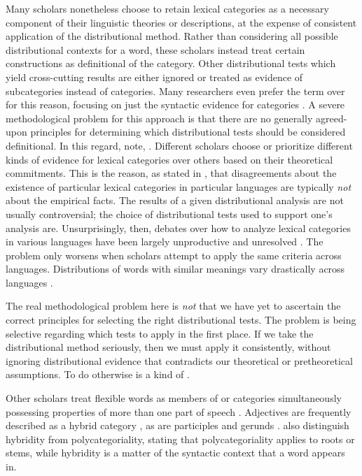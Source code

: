 Many scholars nonetheless choose to retain lexical categories as a necessary component of their linguistic theories or descriptions, at the expense of consistent application of the distributional method. Rather than considering all possible distributional contexts for a word, these scholars instead treat certain constructions as definitional of the category. Other distributional tests which yield cross-cutting results are either ignored or treated as evidence of subcategories instead of categories. Many researchers even prefer the term  over  for this reason, focusing on just the syntactic evidence for categories \parencites{Baker2003}{Rauh2010}. A severe methodological problem for this approach is that there are no generally agreed-upon principles for determining which distributional tests should be considered definitional. In this regard, \textcite[4]{SchachterShopen2007} note,  . Different scholars choose or prioritize different kinds of evidence for lexical categories over others based on their theoretical commitments. This is the reason, as stated in , that disagreements about the existence of particular lexical categories in particular languages are typically \emph{not} about the empirical facts. The results of a given distributional analysis are not usually controversial; the choice of distributional tests used to support one's analysis are. Unsurprisingly, then, debates over how to analyze lexical categories in various languages have been largely unproductive and unresolved \parencite[435]{Croft2005}. The problem only worsens when scholars attempt to apply the same criteria across languages. Distributions of words with similar meanings vary drastically across languages \parencite[§1.4.1]{Croft2001b}.

The real methodological problem here is \emph{not} that we have yet to ascertain the correct principles for selecting the right distributional tests. The problem is being selective regarding which tests to apply in the first place. If we take the distributional method seriously, then we must apply it consistently, without ignoring distributional evidence that contradicts our theoretical or pretheoretical assumptions. To do otherwise is a kind of  \parencite[30, 41]{Croft2001b}.

Other scholars treat flexible words as members of  or  categories simultaneously possessing properties of more than one part of speech \parencites[149]{Loisetal2017}{Malouf1999}{NikolaevaSpencer2020}. Adjectives are frequently described as a hybrid category \parencites{Wetzer1996}[343]{Stassen1997}[13--16]{Pustet2003}[95]{GenettiHildebrandt2004}{Lier2017}, as are participles \parencite[704]{HopperThompson1984} and gerunds \parencite{Denison2001}. \textcite[149]{Loisetal2017} also distinguish hybridity from polycategoriality, stating that polycategoriality applies to roots or stems, while hybridity is a matter of the syntactic context that a word appears in.

